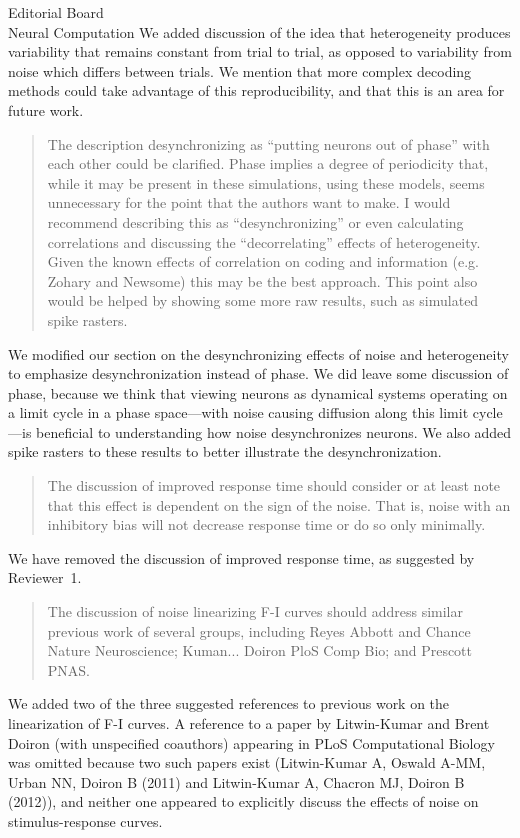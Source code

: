 \documentclass[]{letter}
\begin{document}
\begin{letter}{Editorial Board\\Neural Computation}
We added discussion of the idea that heterogeneity produces variability that remains constant from trial to trial, as opposed to variability from noise which differs between trials. We mention that more complex decoding methods could take advantage of this reproducibility, and that this is an area for future work.

\begin{quotation}
  The description desynchronizing as ``putting neurons out of phase'' with each other could be clarified.  Phase implies a degree of periodicity that, while it may be present in these simulations, using these models, seems unnecessary for the point that the authors want to make.  I would recommend describing this as ``desynchronizing'' or even calculating correlations and discussing the ``decorrelating'' effects of heterogeneity.  Given the known effects of correlation on coding and information  (e.g. Zohary and Newsome) this may be the best approach.  This point also would be helped by showing some more raw results, such as simulated spike rasters.
\end{quotation}

We modified our section on the desynchronizing effects of noise and heterogeneity to emphasize desynchronization instead of phase. We did leave some discussion of phase, because we think that viewing neurons as dynamical systems operating on a limit cycle in a phase space---with noise causing diffusion along this limit cycle---is beneficial to understanding how noise desynchronizes neurons. We also added spike rasters to these results to better illustrate the desynchronization.

\begin{quotation}
  The discussion of improved response time should consider or at least note that this effect is dependent on the sign of the noise.  That is, noise with an inhibitory bias will not decrease response time or do so only minimally.
\end{quotation}

We have removed the discussion of improved response time, as suggested by Reviewer~1.

\begin{quotation}
  The discussion of noise linearizing F-I curves should address similar previous work of several groups, including Reyes Abbott and Chance Nature Neuroscience; Kuman... Doiron PloS Comp Bio; and Prescott PNAS.
\end{quotation}

We added two of the three suggested references to previous work on the linearization of F-I curves. A reference to a paper by Litwin-Kumar and Brent Doiron (with unspecified coauthors) appearing in PLoS Computational Biology was omitted because two such papers exist (Litwin-Kumar A, Oswald A-MM, Urban NN, Doiron B (2011) and Litwin-Kumar A, Chacron MJ, Doiron B (2012)), and neither one appeared to explicitly discuss the effects of noise on stimulus-response curves.


\end{letter}
\end{document}
